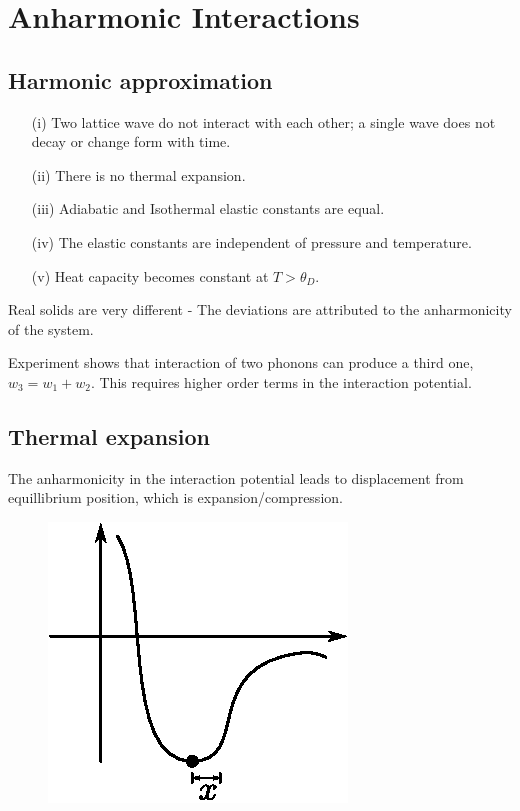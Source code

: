 \section*{Anharmonic Interactions}

\subsection*{Harmonic approximation}
\begin{itemize}
\itemsep=0pt
\item[(i)] Two lattice wave do not interact with each other; a single wave does not decay or change form with time.

\item[(ii)] There is no thermal expansion.

\item[(iii)] Adiabatic and Isothermal elastic constants are equal.

\item[(iv)] The elastic constants are independent of pressure and temperature.

\item[(v)] Heat capacity becomes constant at $T>\theta_{D}$.
\end{itemize}
Real solids are very different - The deviations are attributed to the anharmonicity of the system.

Experiment shows that interaction of two phonons can produce a third one, $w_{3}=w_{1}+w_{2}$. This requires higher order terms in the interaction potential.

\subsection*{Thermal expansion}

The anharmonicity in the interaction potential leads to displacement from equillibrium position, which is expansion/compression.
\begin{figure}[H]
\centering
\includegraphics{images/lecture20/fig5.eps}
\end{figure}

